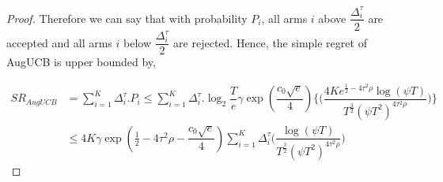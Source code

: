 \begin{proof}


Therefore we can say that with probability $P_{i}$, all arms $i$ above $\dfrac{\Delta_{i}^{\tau}}{2}$ are accepted and all arms $i$ below $\dfrac{\Delta_{i}^{\tau}}{2}$ are rejected. Hence, the simple regret of AugUCB is upper bounded by,

\begin{align*}
SR_{AugUCB} &= \sum_{i=1}^{K} \Delta_{i}^{\tau}. P_{i} \leq \sum_{i=1}^{K} \Delta_{i}^{\tau}. \log_{2}\dfrac{T}{e}\gamma \exp(\dfrac{c_{0}\sqrt{e}}{4})\bigg\lbrace\bigg(\dfrac{4Ke^{\frac{1}{2}-4\tau^{2}\rho}\log (\psi T )}{T^{\frac{3}{2}}(\psi T^2)^{4\tau^{2}\rho}}\bigg) \bigg\rbrace \\
&\leq 4K \gamma \exp(\frac{1}{2}- 4\tau^{2}\rho -\dfrac{c_{0}\sqrt{e}}{4}) \sum_{i=1}^{K} \Delta_{i}^{\tau} \bigg(\dfrac{\log (\psi T )}{T^{\frac{3}{2}}(\psi T^2)^{4\tau^{2}\rho}}\bigg) 
\end{align*}


\end{proof}
